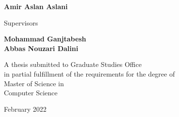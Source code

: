 \documentclass[12pt]{report}
\begin{document}
\begin{latin}
		\begin{center}
			\textbf{
				Amir Aslan Aslani
				\\[30pt]
			}
		\end{center}
		
		
		\begin{center}
			Supervisors
		\end{center}
		\begin{center}
			\textbf{
				Mohammad Ganjtabesh
				\\[5pt]
				Abbas Nouzari Dalini
			}
		\end{center}
		
		
		\vspace{3cm}
		\begin{center}
			A thesis submitted to Graduate Studies Office\\
			in partial fulfillment of the requirements for the degree of \\
			Master of Science in\\
			Computer Science
		\end{center}
		
		\begin{center}
			February 2022
		\end{center}
		
		
	\end{latin}
	
\end{document}

